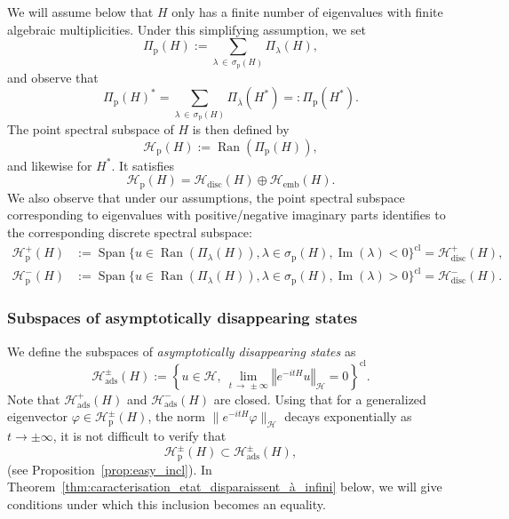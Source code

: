 \documentclass[AHL,Unicode,longabstracts,published]{cedram}
\newcommand{\Hi}{\mathcal{H}}
\newcommand{\rmp}{\mathrm{p}}
\newcommand{\ads}{\mathrm{ads}}
\newcommand{\disc}{\mathrm{disc}}
\newcommand{\norme}[1]{\left\Vert #1\right\Vert}
\DeclareMathOperator{\Ran}{Ran}
\DeclareMathOperator{\Span}{Span}
\DeclareMathOperator{\im}{Im}
\newcommand{\Hi}{\mathcal{H}}
\newcommand{\rmp}{\mathrm{p}}
\DeclareMathOperator{\im}{Im}
\begin{document}
We will assume below that $H$ only has a finite number of eigenvalues with finite algebraic multiplicities. Under this simplifying assumption, we set
\begin{equation*}
\Pi_\rmp(H):=\sum_{\lambda\,\in\,\sigma_{\rmp}(H)} \Pi_\lambda(H),
\end{equation*}
and observe that
\begin{equation*}
\Pi_\rmp(H)^*=\sum_{\lambda\,\in\,\sigma_{\rmp}(H)} \Pi_{\overline{\lambda}}(H^*)=:\Pi_\rmp(H^*).
\end{equation*}
The point spectral subspace of $H$ is then defined by
\begin{equation*}
\Hi_{\rmp}(H):=\Ran(\Pi_{\rmp}(H)),
\end{equation*}
and likewise for $H^*$. It satisfies
\begin{equation*}
\Hi_{\rmp}(H)=\Hi_{\disc}(H)\oplus\Hi_{\mathrm{emb}}(H).
\end{equation*}
We also observe that under our assumptions, the point spectral subspace corresponding to eigenvalues with positive/negative imaginary parts identifies to the corresponding discrete spectral subspace:
\begin{align}
\Hi_\rmp^+(H)&:=\Span\big\lbrace u\in\Ran\left(\Pi_\lambda(H)\right),\lambda\in\sigma_\rmp(H),\im(\lambda)<0\big\rbrace^{\mathrm{cl}}=\Hi_\disc^+(H),\\
\Hi_\rmp^-(H)&:=\Span\big\lbrace u\in\Ran\left(\Pi_\lambda(H)\right),\lambda\in\sigma_\rmp(H),\im(\lambda)>0\big\rbrace^{\mathrm{cl}}=\Hi_\disc^-(H).
\end{align}

\subsubsection{Subspaces of asymptotically disappearing states}

We define the subspaces of \emph{asymptotically disappearing states} as
\begin{equation*}
\Hi_\ads^\pm(H):=\left\lbrace u\in\Hi,~\lim_{t\,\rightarrow\,\pm\infty}\norme{e^{-itH}u}_\Hi=0\right\rbrace^{\mathrm{cl}}.
\end{equation*}
Note that $\Hi^+_\ads(H)$ and $\Hi^-_\ads(H)$ are closed. Using that for a generalized eigenvector $\varphi \in \Hi^\pm_\rmp(H)$, the norm $\|e^{-itH}\varphi\|_\Hi$ decays exponentially as $t\to\pm\infty$, it is not difficult to verify that
\begin{equation*}
\Hi_\rmp^\pm(H) \subset \Hi_\ads^\pm(H),
\end{equation*}
(see Proposition~\ref{prop:easy_incl}). In Theorem~\ref{thm:caracterisation_etat_disparaissent_à_infini} below, we will give conditions under which this inclusion becomes an equality.
\end{document}
